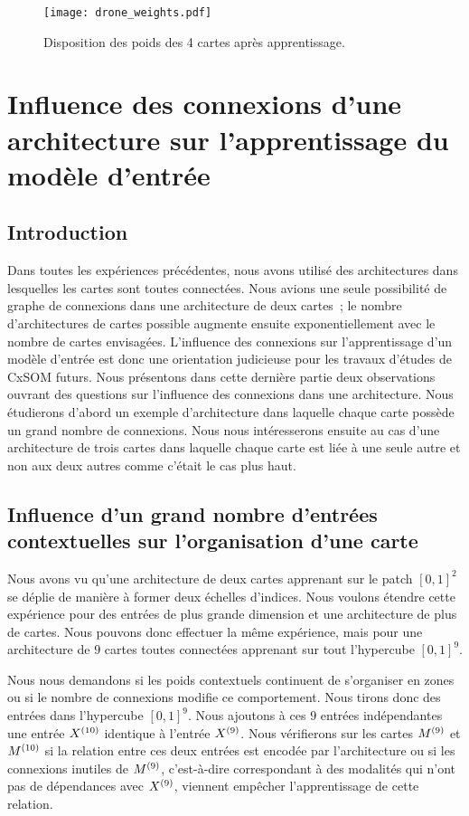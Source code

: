 \documentclass[../main]{subfiles}
\begin{document}
\begin{figure}
\texttt{[image: drone\_weights.pdf]}
\caption{Disposition des poids des 4 cartes après apprentissage.}
\label{fig:drone_w}
\end{figure}

\section{Influence des connexions d'une architecture sur l'apprentissage du modèle d'entrée}

\subsection{Introduction}
Dans toutes les expériences précédentes, nous avons utilisé des architectures dans lesquelles les cartes sont toutes connectées.
Nous avions une seule possibilité de graphe de connexions dans une architecture de deux cartes~; le nombre d'architectures de cartes possible augmente ensuite exponentiellement avec le nombre de cartes envisagées.
L'influence des connexions sur l'apprentissage d'un modèle d'entrée est donc une orientation judicieuse pour les travaux d'études de CxSOM futurs.
Nous présentons dans cette dernière partie deux observations ouvrant des questions sur l'influence des connexions dans une architecture.
Nous étudierons d'abord un exemple d'architecture dans laquelle chaque carte possède un grand nombre de connexions.
Nous nous intéresserons ensuite au cas d'une architecture de trois cartes dans laquelle chaque carte est liée à une seule autre et non aux deux autres comme c'était le cas plus haut.

\subsection{Influence d'un grand nombre d'entrées contextuelles sur l'organisation d'une carte}

Nous avons vu qu'une architecture de deux cartes apprenant sur le patch $[0,1]^2$ se déplie de manière à former deux échelles d'indices. 
Nous voulons étendre cette expérience pour des entrées de plus grande dimension et une architecture de plus de cartes. Nous pouvons donc effectuer la même expérience, mais pour une architecture de $9$ cartes toutes connectées apprenant sur tout l'hypercube $[0,1]^9$.

Nous nous demandons si les poids contextuels continuent de s'organiser en zones ou si le nombre de connexions modifie ce comportement. Nous tirons donc des entrées dans l'hypercube $[0,1]^9$. 
Nous ajoutons à ces $9$ entrées indépendantes une entrée $X^{({10})}$ identique à l'entrée $X^{({9})}$. 
Nous vérifierons sur les cartes $M^{({9})}$ et $M^{({10})}$ si la relation entre ces deux entrées est encodée par l'architecture ou si les connexions \og inutiles \fg{} de $M^{({9})}$, c'est-à-dire correspondant à des modalités qui n'ont pas de dépendances avec $X^{({9})}$, viennent empêcher l'apprentissage de cette relation.
\end{document}
